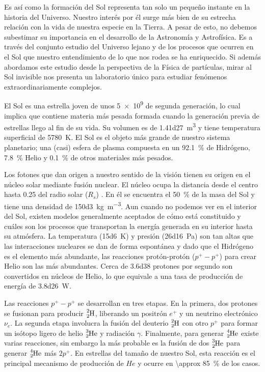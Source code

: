 Es así como la formación del Sol representa tan solo un pequeño instante en la historia del Universo. Nuestro interés por él surge más bien de su estrecha relación con la vida de nuestra especie en la Tierra. A pesar de esto, no debemos subestimar su importancia en el desarrollo de la Astronomía y Astrofísica. Es a través del conjunto estudio del Universo lejano y de los procesos que ocurren en el Sol que nuestro entendimiento de lo que nos rodea se ha enriquecido. Si además abordamos este estudio desde la perspectiva de la Física de partículas, mirar al Sol invisible nos presenta un laboratorio único para estudiar fenómenos extraordinariamente complejos. 

El Sol es una estrella joven de unos \SI{5e9}{\year} de segunda generación, lo cual implica que contiene materia más pesada formada cuando la generación previa de estrellas llego al fin de su vida. Su volumen es de \SI{1.41d27}{\cubic\metre} y tiene temperatura superficial de \SI{5780}{\kelvin}. El Sol es el objeto más grande de nuestro sistema planetario; una (casi) esfera de plasma compuesta en un \SI{92.1}{\percent} de Hidrógeno, \SI{7.8}{\percent} Helio y \SI{0.1}{\percent} de otros materiales más pesados.

Los fotones que dan origen a nuestro sentido de la visión tienen su origen en el núcleo solar mediante fusión nuclear. El núcleo ocupa la distancia desde el centro hasta \num{0.25} del radio solar ($R_{s}$) \cite{fisica13}. En él se encuentra el \SI{50}{\percent} de la masa del Sol y tiene una densidad de \SI{150d3}{\kilogram\per\cubic\metre}. Aun cuando no podemos ver en el interior del Sol, existen modelos generalmente aceptados de cómo está constituido y cuáles son los procesos que transportan la energía generada en su interior hasta su atmósfera. La temperatura (\SI{15d6}{\kelvin}) y presión (\SI{26d16}{\pascal}) son tan altas que las interacciones nucleares se dan de forma espontánea y dado que el Hidrógeno es el elemento más abundante, las reacciones protón-protón ($p^{+}-p^{+}$) para crear Helio son las más abundantes. Cerca de \num{3.6d38} protones por segundo son convertidos en núcleos de Helio, lo que equivale a una tasa de producción de energía de \SI{3.8d26}{\watt}.

Las reacciones $p^{+}-p^{+}$ se desarrollan en tres etapas. En la primera, dos protones se fusionan para producir $\ce{_{2}^{2}H}$, liberando un positrón $e^{+}$ y un neutrino electrónico $\nu_{e}$. La segunda etapa involucra la fusión del deuterio $\ce{_{2}^{2}H}$ con otro $p^{+}$ para formar un isótopo ligero de helio $\ce{_{2}^{3}He}$ y radiación $\gamma$. Finalmente, para generar $\ce{_{2}^{4}He}$ existe varias reacciones, sin embargo la más probable es la fusión de dos $\ce{_{2}^{3}He}$  para generar  $\ce{_{2}^{4}He}$ más $2p^{+}$. En estrellas del tamaño de nuestro Sol, esta reacción es el principal mecanismo de producción de $He$ y ocurre en \SI{\approx 85}{\percent} de los casos.

